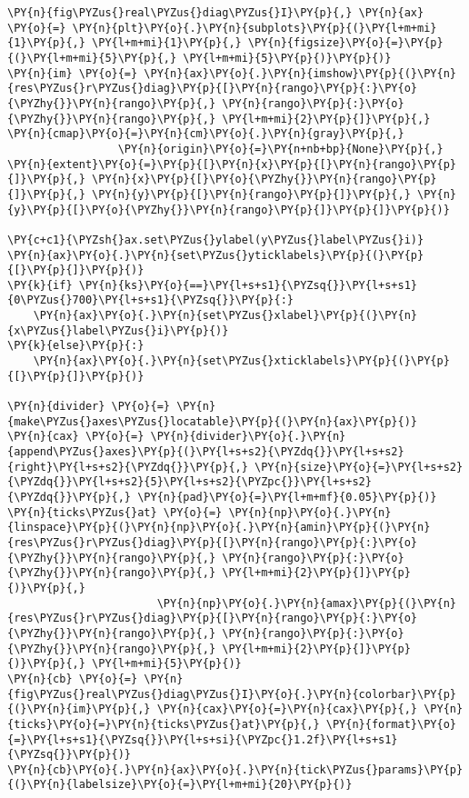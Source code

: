 \begin{Verbatim}[commandchars=\\\{\}]
\PY{n}{fig\PYZus{}real\PYZus{}diag\PYZus{}I}\PY{p}{,} \PY{n}{ax} \PY{o}{=} \PY{n}{plt}\PY{o}{.}\PY{n}{subplots}\PY{p}{(}\PY{l+m+mi}{1}\PY{p}{,} \PY{l+m+mi}{1}\PY{p}{,} \PY{n}{figsize}\PY{o}{=}\PY{p}{(}\PY{l+m+mi}{5}\PY{p}{,} \PY{l+m+mi}{5}\PY{p}{)}\PY{p}{)}
\PY{n}{im} \PY{o}{=} \PY{n}{ax}\PY{o}{.}\PY{n}{imshow}\PY{p}{(}\PY{n}{res\PYZus{}r\PYZus{}diag}\PY{p}{[}\PY{n}{rango}\PY{p}{:}\PY{o}{\PYZhy{}}\PY{n}{rango}\PY{p}{,} \PY{n}{rango}\PY{p}{:}\PY{o}{\PYZhy{}}\PY{n}{rango}\PY{p}{,} \PY{l+m+mi}{2}\PY{p}{]}\PY{p}{,} \PY{n}{cmap}\PY{o}{=}\PY{n}{cm}\PY{o}{.}\PY{n}{gray}\PY{p}{,}
                 \PY{n}{origin}\PY{o}{=}\PY{n+nb+bp}{None}\PY{p}{,} \PY{n}{extent}\PY{o}{=}\PY{p}{[}\PY{n}{x}\PY{p}{[}\PY{n}{rango}\PY{p}{]}\PY{p}{,} \PY{n}{x}\PY{p}{[}\PY{o}{\PYZhy{}}\PY{n}{rango}\PY{p}{]}\PY{p}{,} \PY{n}{y}\PY{p}{[}\PY{n}{rango}\PY{p}{]}\PY{p}{,} \PY{n}{y}\PY{p}{[}\PY{o}{\PYZhy{}}\PY{n}{rango}\PY{p}{]}\PY{p}{]}\PY{p}{)}

\PY{c+c1}{\PYZsh{}ax.set\PYZus{}ylabel(y\PYZus{}label\PYZus{}i)}
\PY{n}{ax}\PY{o}{.}\PY{n}{set\PYZus{}yticklabels}\PY{p}{(}\PY{p}{[}\PY{p}{]}\PY{p}{)}
\PY{k}{if} \PY{n}{ks}\PY{o}{==}\PY{l+s+s1}{\PYZsq{}}\PY{l+s+s1}{0\PYZus{}700}\PY{l+s+s1}{\PYZsq{}}\PY{p}{:}
    \PY{n}{ax}\PY{o}{.}\PY{n}{set\PYZus{}xlabel}\PY{p}{(}\PY{n}{x\PYZus{}label\PYZus{}i}\PY{p}{)}
\PY{k}{else}\PY{p}{:}
    \PY{n}{ax}\PY{o}{.}\PY{n}{set\PYZus{}xticklabels}\PY{p}{(}\PY{p}{[}\PY{p}{]}\PY{p}{)}

\PY{n}{divider} \PY{o}{=} \PY{n}{make\PYZus{}axes\PYZus{}locatable}\PY{p}{(}\PY{n}{ax}\PY{p}{)}
\PY{n}{cax} \PY{o}{=} \PY{n}{divider}\PY{o}{.}\PY{n}{append\PYZus{}axes}\PY{p}{(}\PY{l+s+s2}{\PYZdq{}}\PY{l+s+s2}{right}\PY{l+s+s2}{\PYZdq{}}\PY{p}{,} \PY{n}{size}\PY{o}{=}\PY{l+s+s2}{\PYZdq{}}\PY{l+s+s2}{5}\PY{l+s+s2}{\PYZpc{}}\PY{l+s+s2}{\PYZdq{}}\PY{p}{,} \PY{n}{pad}\PY{o}{=}\PY{l+m+mf}{0.05}\PY{p}{)}
\PY{n}{ticks\PYZus{}at} \PY{o}{=} \PY{n}{np}\PY{o}{.}\PY{n}{linspace}\PY{p}{(}\PY{n}{np}\PY{o}{.}\PY{n}{amin}\PY{p}{(}\PY{n}{res\PYZus{}r\PYZus{}diag}\PY{p}{[}\PY{n}{rango}\PY{p}{:}\PY{o}{\PYZhy{}}\PY{n}{rango}\PY{p}{,} \PY{n}{rango}\PY{p}{:}\PY{o}{\PYZhy{}}\PY{n}{rango}\PY{p}{,} \PY{l+m+mi}{2}\PY{p}{]}\PY{p}{)}\PY{p}{,}
                       \PY{n}{np}\PY{o}{.}\PY{n}{amax}\PY{p}{(}\PY{n}{res\PYZus{}r\PYZus{}diag}\PY{p}{[}\PY{n}{rango}\PY{p}{:}\PY{o}{\PYZhy{}}\PY{n}{rango}\PY{p}{,} \PY{n}{rango}\PY{p}{:}\PY{o}{\PYZhy{}}\PY{n}{rango}\PY{p}{,} \PY{l+m+mi}{2}\PY{p}{]}\PY{p}{)}\PY{p}{,} \PY{l+m+mi}{5}\PY{p}{)} 
\PY{n}{cb} \PY{o}{=} \PY{n}{fig\PYZus{}real\PYZus{}diag\PYZus{}I}\PY{o}{.}\PY{n}{colorbar}\PY{p}{(}\PY{n}{im}\PY{p}{,} \PY{n}{cax}\PY{o}{=}\PY{n}{cax}\PY{p}{,} \PY{n}{ticks}\PY{o}{=}\PY{n}{ticks\PYZus{}at}\PY{p}{,} \PY{n}{format}\PY{o}{=}\PY{l+s+s1}{\PYZsq{}}\PY{l+s+si}{\PYZpc{}1.2f}\PY{l+s+s1}{\PYZsq{}}\PY{p}{)}
\PY{n}{cb}\PY{o}{.}\PY{n}{ax}\PY{o}{.}\PY{n}{tick\PYZus{}params}\PY{p}{(}\PY{n}{labelsize}\PY{o}{=}\PY{l+m+mi}{20}\PY{p}{)}


\end{Verbatim}
